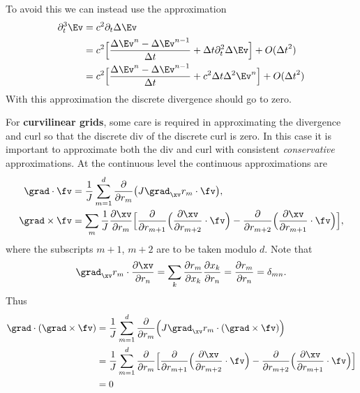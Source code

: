 To avoid this we can instead use the
approximation 
\begin{align}
   \partial_t^3 \Ev &= c^2 \partial_t\Delta \Ev \\
         &= c^2 \Big[ {\Delta \Ev^n -  \Delta\Ev^{n-1} \over \dt} + \dt \partial_t^2 \Delta \Ev \Big] +O(\dt^2) \\
         &= c^2 \Big[ {\Delta \Ev^n -  \Delta\Ev^{n-1} \over \dt} + c^2 \dt \Delta^2 \Ev^n \Big] +O(\dt^2)
\end{align}
With this approximation the discrete divergence should go to zero.


\newcommand{\xrmHat}{\widehat{\xv_{r_m}}}
\newcommand{\rmHat}{\hat{r}_m}
\newcommand{\rnHat}{\hat{r}_n}
For {\bf curvilinear grids}, some care is required in approximating the divergence and curl so that
the discrete div of the discrete curl is zero. 
In this case it is important to approximate both the div and curl with consistent {\em conservative} approximations.
At the continuous level the continuous approximations are
\begin{align*}
  \grad\cdot\fv &= {1\over J}\sum_{m=1}^{d} {\partial\over \partial r_m}\big( J\grad_\xv r_m \cdot \fv\big),\\
  \grad\times\fv  &= \sum_m \frac{1}{J} {\partial\xv\over\partial r_{m}}
                          \Big[ {\partial\over\partial r_{m+1}}\Big( {\partial\xv\over\partial r_{m+2}}\cdot\fv \Big) -
                                {\partial\over\partial r_{m+2}}\Big( {\partial\xv\over\partial r_{m+1}}\cdot\fv \Big) \Big] ,
\end{align*}
where the subscripts $m+1$, $m+2$ are
to be taken modulo $d$. Note that
\begin{align}
   \grad_\xv r_m \cdot {\partial\xv\over\partial r_{n}} = 
   \sum_k {\partial r_m \over\partial x_k}{\partial x_k \over\partial r_{n}} =
   {\partial r_m \over\partial r_{n}} = \delta_{mn}. \label{eq:ortho}
\end{align}
Thus
\begin{align*}
  \grad\cdot(\grad\times\fv) &= 
           {1\over J}\sum_{m=1}^{d} {\partial\over \partial r_m}\Big( J\grad_\xv r_m \cdot (\grad\times\fv)\Big)\\
   &= {1\over J}\sum_{m=1}^{d} 
  {\partial\over \partial r_m}\Big[ {\partial\over\partial r_{m+1}}\Big( {\partial\xv\over\partial r_{m+2}}\cdot\fv \Big) -
                                {\partial\over\partial r_{m+2}}\Big( {\partial\xv\over\partial r_{m+1}}\cdot\fv \Big) \Big] \\
      &= 0 
\end{align*}

